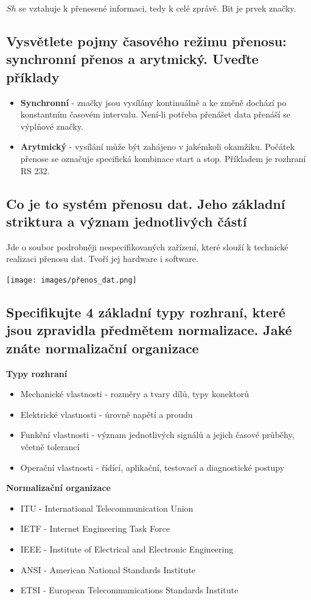 $Sh$ se vztahuje k přenesené informaci, tedy k celé zprávě. Bit je prvek značky.

\subsection{Vysvětlete pojmy časového režimu přenosu: synchronní přenos a arytmický. Uveďte příklady}
\begin{itemize}
    \item  \textbf{Synchronní} - značky jsou vysílány kontinuálně a ke změně dochází po konstantním časovém intervalu.
    Není-li potřeba přenášet data přenáší se výplňové značky.
    \item \textbf{Arytmický} - vysílání může být zahájeno v jakémkoli okamžiku. 
    Počátek přenose se označuje specifická kombinace start a stop. Příkladem je rozhraní RS 232.
    
\end{itemize}

\subsection{Co je to systém přenosu dat. Jeho základní striktura a význam jednotlivých částí}
Jde o soubor podrobněji nespecifikovaných zařízení, které slouží k technické realizaci přenosu dat.
Tvoří jej hardware i software.

\texttt{[image: images/přenos\_dat.png]}

\subsection{Specifikujte  4 základní typy rozhraní, které jsou zpravidla předmětem normalizace. Jaké znáte normalizační organizace}
\textbf{Typy rozhraní}
\begin{itemize}
    \item Mechanické vlastnosti -  rozměry a tvary dílů, typy konektorů
    \item Elektrické vlastnosti - úrovně napětí a proudu
    \item Funkční vlastnosti - význam jednotlivých signálů a jejich časové průběhy, včetně tolerancí
    \item Operační vlastnosti -  řídící, aplikační, testovací a diagnostické postupy
\end{itemize}
\textbf{Normalizační organizace}
\begin{itemize}
    \item ITU - International Telecommunication Union
     \item IETF - Internet Engineering Task Force
     \item IEEE - Institute of Electrical and Electronic Engineering
     \item ANSI - American National Standards Institute
     \item ETSI - European Telecommunications Standards Institute
\end{itemize}

